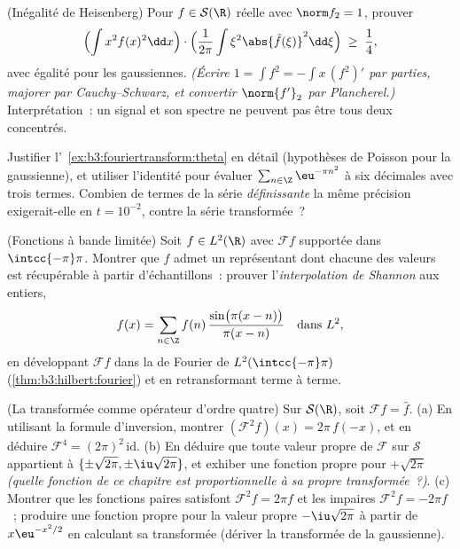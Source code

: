 \begin{exercise}[$\star\star\star$]\label{exo:b3:fouriertransform:8}
(Inégalité de Heisenberg) Pour $f \in \mathcal S(\R)$ réelle
avec $\norm f_2 = 1$, prouver
\[
\Bigl(\int x^2f(x)^2\dd x\Bigr)\cdot
\Bigl(\frac1{2\pi}\int \xi^2\abs{\hat f(\xi)}^2\dd\xi\Bigr)
\;\geq\; \frac14 ,
\]
avec égalité pour les gaussiennes. \emph{(Écrire $1 = \int
f^2 = -\int x\,(f^2)'$ par parties, majorer par
Cauchy--Schwarz, et convertir $\norm{f'}_2$ par Plancherel.)}
Interprétation~: un signal et son spectre ne peuvent pas être
tous deux concentrés.
\end{exercise}

\begin{exercise}[$\star\star$]\label{exo:b3:fouriertransform:9}
Justifier l'~\cref{ex:b3:fouriertransform:theta} en détail
(hypothèses de Poisson pour la gaussienne), et utiliser
l'identité pour évaluer $\sum_{n\in\Z}\eu^{-\pi n^2}$ à six
décimales avec trois termes. Combien de termes de la série
\emph{définissante} la même précision exigerait-elle en $t =
10^{-2}$, contre la série transformée~?
\end{exercise}

\begin{exercise}[$\star\star$]\label{exo:b3:fouriertransform:10}
(Fonctions à bande limitée) Soit $f \in L^2(\R)$ avec
$\mathcal Ff$ supportée dans $\intcc{-\pi}\pi$. Montrer que
$f$ admet un représentant dont chacune des valeurs est
récupérable à partir d'échantillons~: prouver
l'\emph{interpolation de Shannon} aux entiers,
\[
f(x) = \sum_{n\in\Z} f(n)\,
\frac{\sin\bigl(\pi(x - n)\bigr)}{\pi(x - n)}
\quad\text{dans } L^2,
\]
en développant $\mathcal Ff$ dans la  de Fourier de
$L^2(\intcc{-\pi}\pi)$ (\cref{thm:b3:hilbert:fourier}) et en
retransformant terme à terme.
\end{exercise}

\begin{exercise}[$\star\star$]\label{exo:b3:fouriertransform:11}
(La transformée comme opérateur d'ordre quatre) Sur $\mathcal
S(\R)$, soit $\mathcal F f = \hat f$.
(a) En utilisant la formule d'inversion, montrer $(\mathcal
F^2f)(x) = 2\pi\,f(-x)$, et en déduire $\mathcal F^4 =
(2\pi)^2\,\mathrm{id}$.
(b) En déduire que toute valeur propre de $\mathcal F$ sur
$\mathcal S$ appartient à $\{\pm\sqrt{2\pi},
\pm\iu\sqrt{2\pi}\}$, et exhiber une fonction propre pour
$+\sqrt{2\pi}$ \emph{(quelle fonction de ce chapitre est
proportionnelle à sa propre transformée~?)}.
(c) Montrer que les fonctions paires satisfont $\mathcal F^2f
= 2\pi f$ et les impaires $\mathcal F^2f = -2\pi f$~; produire
une fonction propre pour la valeur propre $-\iu\sqrt{2\pi}$ à
partir de $x\eu^{-x^2/2}$ en calculant sa transformée (dériver
la transformée de la gaussienne).
\end{exercise}

